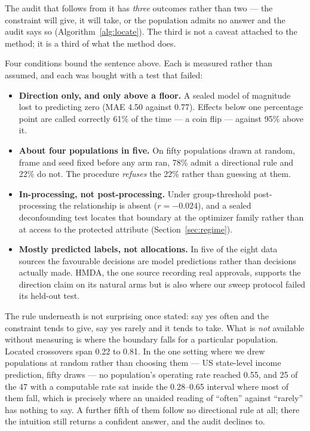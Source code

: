 \documentclass[conference]{IEEEtran}
\begin{document}
The audit that follows from it has \emph{three} outcomes rather than two --- the constraint
will give, it will take, or the population admits no answer and the audit says so
(Algorithm~\ref{alg:locate}). The third is not a caveat attached to the method; it is a third
of what the method does.

Four conditions bound the sentence above. Each is measured rather than assumed, and each was
bought with a test that failed:

\begin{itemize}
\item \textbf{Direction only, and only above a floor.} A sealed model of magnitude lost to
predicting zero (MAE 4.50 against 0.77). Effects below one percentage point are called
correctly 61\% of the time --- a coin flip --- against 95\% above it.
\item \textbf{About four populations in five.} On fifty populations drawn at random, frame
and seed fixed before any arm ran, 78\% admit a directional rule and 22\% do not. The
procedure \emph{refuses} the 22\% rather than guessing at them.
\item \textbf{In-processing, not post-processing.} Under group-threshold post-processing
\cite{hardt2016} the relationship is absent ($r = -0.024$), and a sealed deconfounding test
locates that boundary at the optimizer family rather than at access to the protected
attribute
(Section~\ref{sec:regime}).
\item \textbf{Mostly predicted labels, not allocations.} In five of the eight data sources
the favourable decisions are model predictions rather than decisions actually made. HMDA,
the one source recording real approvals, supports the direction claim on its natural arms
but is also where our sweep protocol failed its held-out test.
\end{itemize}

The rule underneath is not surprising once stated: say yes often and the constraint tends to
give, say yes rarely and it tends to take. What is \emph{not} available without measuring is
where the boundary falls for a particular population. Located crossovers span 0.22 to 0.81. In the one setting where we drew populations at random rather than choosing them --- US
state-level income prediction, fifty draws --- no population's operating rate reached 0.55,
and 25 of the 47 with a computable rate sat inside the 0.28--0.65 interval where most of them fall, which is precisely
where an unaided reading of ``often'' against ``rarely'' has nothing to say. A further fifth
of them follow no directional rule at all; there the intuition still returns a confident
answer, and the audit declines to.
\end{document}
